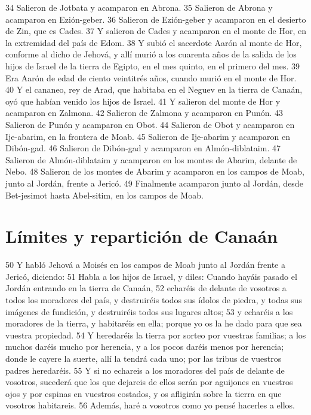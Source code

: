 34 Salieron de Jotbata y acamparon en Abrona.
35 Salieron de Abrona y acamparon en Ezión-geber.
36 Salieron de Ezión-geber y acamparon en el desierto de Zin, que es Cades.
37 Y salieron de Cades y acamparon en el monte de Hor, en la extremidad del país de Edom.
38 Y subió el sacerdote Aarón al monte de Hor, conforme al dicho de Jehová, y allí murió  a los cuarenta años de la salida de los hijos de Israel de la tierra de Egipto, en el mes quinto, en el primero del mes.
39 Era Aarón de edad de ciento veintitrés años, cuando murió en el monte de Hor.
40 Y el cananeo, rey de Arad, que habitaba en el Neguev en la tierra de Canaán, oyó que habían venido los hijos de Israel.
41 Y salieron del monte de Hor y acamparon en Zalmona.
42 Salieron de Zalmona y acamparon en Punón.
43 Salieron de Punón y acamparon en Obot.
44 Salieron de Obot y acamparon en Ije-abarim, en la frontera de Moab.
45 Salieron de Ije-abarim y acamparon en Dibón-gad.
46 Salieron de Dibón-gad y acamparon en Almón-diblataim.
47 Salieron de Almón-diblataim y acamparon en los montes de Abarim, delante de Nebo.
48 Salieron de los montes de Abarim y acamparon en los campos de Moab, junto al Jordán, frente a Jericó.
49 Finalmente acamparon junto al Jordán, desde Bet-jesimot hasta Abel-sitim, en los campos de Moab.
\section*{Límites y repartición de Canaán}

50 Y habló Jehová a Moisés en los campos de Moab junto al Jordán frente a Jericó, diciendo:
51 Habla a los hijos de Israel, y diles: Cuando hayáis pasado el Jordán entrando en la tierra de Canaán,
52 echaréis de delante de vosotros a todos los moradores del país, y destruiréis todos sus ídolos de piedra, y todas sus imágenes de fundición, y destruiréis todos sus lugares altos;
53 y echaréis a los moradores de la tierra, y habitaréis en ella; porque yo os la he dado para que sea vuestra propiedad.
54 Y heredaréis la tierra por sorteo por vuestras familias; a los muchos daréis mucho por herencia, y a los pocos daréis menos por herencia; donde le cayere la suerte, allí la tendrá cada uno; por las tribus de vuestros padres heredaréis.
55 Y si no echareis a los moradores del país de delante de vosotros, sucederá que los que dejareis de ellos serán por aguijones en vuestros ojos y por espinas en vuestros costados, y os afligirán sobre la tierra en que vosotros habitareis.
56 Además, haré a vosotros como yo pensé hacerles a ellos.

